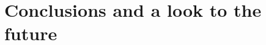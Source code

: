 \documentclass[11pt]{article}
\newcommand{\pkg}[1]{{\normalfont\fontseries{b}\selectfont #1}}
\let\proglang=\textsf
\begin{document}

\section{Conclusions and a look to the future}
\label{sec:conclusion}





\end{document}
